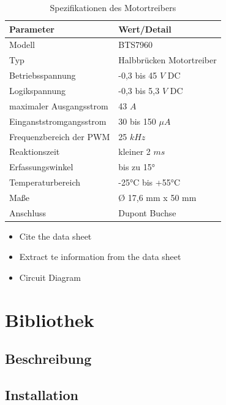 \begin{table}[h!]
	\caption{Spezifikationen des Motortreibers \cite{Infineon:2004}}
	\begin{center}
		\begin{tabular}{|l|l|}
			\hline
			\textbf{Parameter} &\textbf{Wert/Detail}\\
			\hline
			Modell &  BTS7960\\
			\hline
			Typ  & Halbbrücken Motortreiber  \\
			\hline 
			Betriebsspannung & -0,3 bis 45 $V$ DC\\
			\hline 
			Logikspannung & -0,3 bis 5,3 $V$ DC\\
			\hline
			maximaler Ausgangsstrom & 43 $A $\\
			\hline
			Einganststromgangsstrom & 30 bis 150 $\mu A$ \\
			\hline
			Frequenzbereich der PWM  & 25 $kHz$\\
			\hline
			Reaktionszeit & kleiner 2 $ms$\\
			\hline
			Erfassungswinkel & bis zu 15°\\
			\hline
			Temperaturbereich & -25°C bis +55°C\\
			\hline
			Maße & Ø 17,6 mm x 50 mm\\
			\hline
			Anschluss & Dupont Buchse\\ 
			\hline
		\end{tabular}
		\label{TabelleSpezifikationLS}
	\end{center}
\end{table} 

 
 
 
\begin{itemize}
  \item Cite the data sheet
  \item Extract te information from the data sheet
  \item Circuit Diagram
\end{itemize}

\section{Bibliothek}

\subsection{Beschreibung}

\subsection{Installation}

